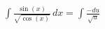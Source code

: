 \documentclass[preview]{standalone}
\begin{document}
\begin{align*}
\int \frac{\sin(x)}{\sqrt{\cos(x)}} \, dx = \int \frac{-du}{\sqrt{u}}
\end{align*}
\end{document}
